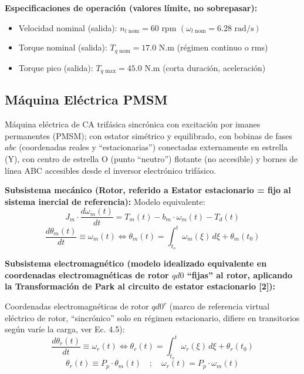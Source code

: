 \documentclass[11pt,a4paper]{article}
\begin{document}
\textbf{Especificaciones de operación (valores límite, no sobrepasar):}
\begin{itemize}
    \item Velocidad nominal (salida): $n_{l \text{ nom}} = 60 \text{ rpm } (\omega_{l \text{ nom}} = 6.28 \text{ rad/s})$
    \item Torque nominal (salida): $T_{q \text{ nom}} = 17.0 \text{ N.m}$ (régimen continuo o rms)
    \item Torque pico (salida): $T_{q \text{ max}} = 45.0 \text{ N.m}$ (corta duración, aceleración)
\end{itemize}

\subsection*{Máquina Eléctrica PMSM}
Máquina eléctrica de CA trifásica sincrónica con excitación por imanes permanentes (PMSM); con estator simétrico y equilibrado, con bobinas de fases $abc$ (coordenadas reales y ``estacionarias'') conectadas externamente en estrella (Y), con centro de estrella O (punto ``neutro'') flotante (no accesible) y bornes de línea ABC accesibles desde el inversor electrónico trifásico.

\textbf{Subsistema mecánico (Rotor, referido a Estator estacionario = fijo al sistema inercial de referencia):}
Modelo equivalente:
\begin{equation}
J_{m} \cdot \frac{d\omega_{m}(t)}{dt} = T_{m}(t) - b_{m} \cdot \omega_{m}(t) - T_{d}(t) \tag{Ec. 3.1}
\end{equation}
\begin{equation}
\frac{d\theta_{m}(t)}{dt} \equiv \omega_{m}(t) \Leftrightarrow \theta_{m}(t) = \int_{t_o}^{t} \omega_{m}(\xi) \, d\xi + \theta_{m}(t_{0}) \tag{Ec. 3.2}
\end{equation}

\textbf{Subsistema electromagnético (modelo idealizado equivalente en coordenadas electromagnéticas de rotor $qd0$ ``fijas'' al rotor, aplicando la Transformación de Park al circuito de estator estacionario [2]):}

Coordenadas electromagnéticas de rotor $qd0^r$ (marco de referencia virtual eléctrico de rotor, ``sincrónico'' solo en régimen estacionario, difiere en transitorios según varíe la carga, ver Ec. 4.5):
\begin{equation}
\frac{d\theta_{r}(t)}{dt} \equiv \omega_{r}(t) \Leftrightarrow \theta_{r}(t) = \int_{t_o}^{t} \omega_{r}(\xi) \, d\xi + \theta_{r}(t_{0}) \tag{Ec. 3.3}
\end{equation}
\begin{equation}
\theta_{r}(t) \equiv P_p \cdot \theta_{m}(t) \quad ; \quad \omega_{r}(t) = P_p \cdot \omega_{m}(t) \tag{Ec. 3.4}
\end{equation}
\end{document}
